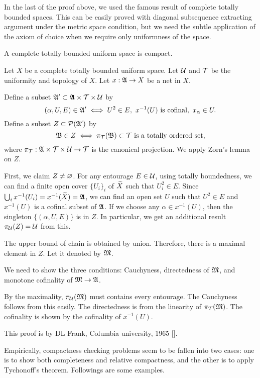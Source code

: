 \documentclass{../exp}
\begin{document}
In the last of the proof above, we used the famous result of complete totally bounded spaces.
This can be easily proved with diagonal subsequence extracting argument under the metric space condition, but we need the subtle application of the axiom of choice when we require only uniformness of the space.

\begin{thm}
A complete totally bounded uniform space is compact.
\end{thm}
\begin{pf}[1]
Let $X$ be a complete totally bounded uniform space.
Let $\mathcal{U}$ and $\mathcal{T}$ be the uniformity and topology of $X$.
Let $x:\fA\to X$ be a net in $X$.

Define a subset $\mathfrak{A}'\subset\mathfrak{A}\times\mathcal{T}\times\mathcal{U}$ by
\[(\alpha,U,E)\in\fA'\iff U^2\in E,\ x^{-1}(U)\text{ is cofinal},\ x_\alpha\in U.\]
Define a subset $Z\subset\mathcal{P}(\mathfrak{A}')$ by
\[\fB\in Z\iff \pi_\cT(\fB)\subset\cT\text{ is a totally ordered set},\]
where $\pi_\cT:\fA\x\cT\x\cU\to\cT$ is the canonical projection.
We apply Zorn's lemma on $Z$.

First, we claim $Z\ne\varnothing$.
For any entourage $E\in\mathcal{U}$, using totally boundedness, we can find a finite open cover $\{U_i\}_i$ of $\widetilde X$ such that $U_i^2\in E$.
Since $\bigcup_ix^{-1}(U_i)=x^{-1}(\widetilde X)=\mathfrak{A}$, we can find an open set $U$ such that $U^2\in E$ and $x^{-1}(U)$ is a cofinal subset of $\mathfrak{A}$.
If we choose any $\alpha\in x^{-1}(U)$, then the singleton $\{(\alpha,U,E)\}$ is in $Z$.
In particular, we get an additional result $\pi_{\mathcal{U}}(Z)=\mathcal{U}$ from this.

The upper bound of chain is obtained by union.
Therefore, there is a maximal element in $Z$.
Let it denoted by $\mathfrak{M}$.

We need to show the three conditions: Cauchyness, directedness of $\mathfrak{M}$, and monotone cofinality of $\fM\to\fA$.

By the maximality, $\pi_{\mathcal{U}}(\mathfrak{M})$ must contains every entourage.
The Cauchyness follows from this easily.
The directedness is from the linearity of $\pi_{\mathcal{T}}(\mathfrak{M})$.
The cofinality is shown by the cofinality of $x^{-1}(U)$.
\end{pf}
\begin{pf}[2]
This proof is by DL Frank, Columbia university, 1965 [].

\end{pf}


Empirically, compactness checking problems seem to be fallen into two cases: one is to show both completeness and relative compactness, and the other is to apply Tychonoff's theorem.
Followings are some examples.
\end{document}
